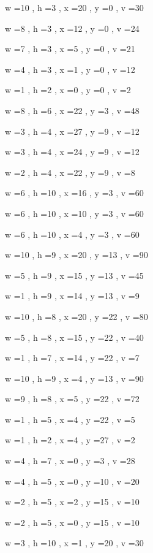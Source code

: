 \documentclass[11pt]{article}
\begin{document}


w =10 , h =3 , x =20 , y =0 , v =30
\par
w =8 , h =3 , x =12 , y =0 , v =24
\par
w =7 , h =3 , x =5 , y =0 , v =21
\par
w =4 , h =3 , x =1 , y =0 , v =12
\par
w =1 , h =2 , x =0 , y =0 , v =2
\par
w =8 , h =6 , x =22 , y =3 , v =48
\par
w =3 , h =4 , x =27 , y =9 , v =12
\par
w =3 , h =4 , x =24 , y =9 , v =12
\par
w =2 , h =4 , x =22 , y =9 , v =8
\par
w =6 , h =10 , x =16 , y =3 , v =60
\par
w =6 , h =10 , x =10 , y =3 , v =60
\par
w =6 , h =10 , x =4 , y =3 , v =60
\par
w =10 , h =9 , x =20 , y =13 , v =90
\par
w =5 , h =9 , x =15 , y =13 , v =45
\par
w =1 , h =9 , x =14 , y =13 , v =9
\par
w =10 , h =8 , x =20 , y =22 , v =80
\par
w =5 , h =8 , x =15 , y =22 , v =40
\par
w =1 , h =7 , x =14 , y =22 , v =7
\par
w =10 , h =9 , x =4 , y =13 , v =90
\par
w =9 , h =8 , x =5 , y =22 , v =72
\par
w =1 , h =5 , x =4 , y =22 , v =5
\par
w =1 , h =2 , x =4 , y =27 , v =2
\par
w =4 , h =7 , x =0 , y =3 , v =28
\par
w =4 , h =5 , x =0 , y =10 , v =20
\par
w =2 , h =5 , x =2 , y =15 , v =10
\par
w =2 , h =5 , x =0 , y =15 , v =10
\par
w =3 , h =10 , x =1 , y =20 , v =30
\par
\newpage
\end{document}
